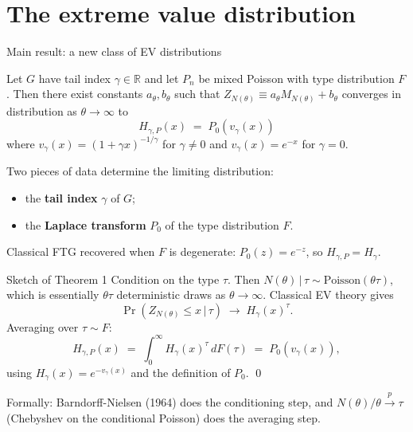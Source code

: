 \documentclass[aspectratio=169,xcolor=dvipsnames]{beamer}
\begin{document}
\section{The extreme value distribution}

\begin{frame}{Main result: a new class of EV distributions}
    \begin{theorem}[Mangin, 2025]
        Let $G$ have tail index $\gamma\in\mathbb{R}$ and let $P_n$ be mixed Poisson with type distribution $F$. Then there exist constants $a_\theta, b_\theta$ such that $Z_{N(\theta)} \equiv a_\theta M_{N(\theta)} + b_\theta$ converges in distribution as $\theta\to\infty$ to
        \[
            \boxed{\;H_{\gamma,P}(x) \;=\; P_0\!\left(v_\gamma(x)\right)\;}
        \]
        where $v_\gamma(x) = (1+\gamma x)^{-1/\gamma}$ for $\gamma\ne 0$ and $v_\gamma(x)=e^{-x}$ for $\gamma=0$.
    \end{theorem}
    \vspace{2mm}
    Two pieces of data determine the limiting distribution:
    \begin{itemize}
        \item the \textbf{tail index} $\gamma$ of $G$;
        \item the \textbf{Laplace transform} $P_0$ of the type distribution $F$.
    \end{itemize}
    Classical FTG recovered when $F$ is degenerate: $P_0(z)=e^{-z}$, so $H_{\gamma,P}=H_\gamma$.
\end{frame}

\begin{frame}{Sketch of Theorem 1}
    Condition on the type $\tau$. Then $N(\theta)\,|\,\tau \sim \text{Poisson}(\theta\tau)$, which is essentially $\theta\tau$ deterministic draws as $\theta\to\infty$. Classical EV theory gives
    \[
        \Pr(Z_{N(\theta)} \le x \,|\, \tau) \;\longrightarrow\; H_\gamma(x)^\tau.
    \]
    Averaging over $\tau\sim F$:
    \[
        H_{\gamma,P}(x) \;=\; \int_0^\infty H_\gamma(x)^\tau\, dF(\tau) \;=\; P_0(v_\gamma(x)),
    \]
    using $H_\gamma(x) = e^{-v_\gamma(x)}$ and the definition of $P_0$. \qed

    \vspace{3mm}
    \footnotesize Formally: Barndorff-Nielsen (1964) does the conditioning step, and $N(\theta)/\theta \xrightarrow{p} \tau$ (Chebyshev on the conditional Poisson) does the averaging step.
\end{frame}
\end{document}
